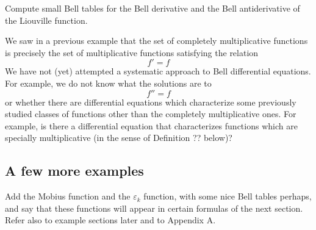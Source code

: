 \begin{exercise}
Compute small Bell tables for the Bell derivative and the Bell antiderivative of the Liouville function.
\end{exercise}



\begin{remark}
We saw in a previous example that the set of completely multiplicative functions is precisely the set of multiplicative functions satisfying the relation
$$ f' = f $$
We have not (yet) attempted a systematic approach to Bell differential equations. For example, we do not know what the solutions are to
$$ f'' = f   $$
or whether there are differential equations which characterize some previously studied classes of functions other than the completely multiplicative ones. For example, is there a differential equation that characterizes functions which are specially multiplicative (in the sense of Definition ?? below)?
\end{remark}


\subsection{A few more examples}

Add the Mobius function and the $\varepsilon_k$ function, with some nice Bell tables perhaps, and say that these functions will appear in certain formulas of the next section. Refer also to example sections later and to Appendix A.
